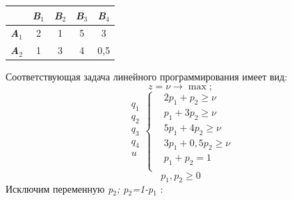 
\renewcommand{\arraystretch}{1.5}
\renewcommand{\tabcolsep}{0.2cm}
\begin{table}[h!]
\label{table_4_5}
\begin{center}
\begin{tabular}{|c|c|c|c|c|}
    \hline
     &  \textbf{\emph{B$_{1}$}} &  \textbf{\emph{B$_{2}$}} & \textbf{\emph{B$_{3}$}} & \textbf{\emph{B$_{4}$}}  \\ \hline
  \multicolumn{1}{|c|}{\textbf{\emph{A$_{1}$}}} & 2 & 1 & 5 & 3  \\ \hline
  \multicolumn{1}{|c|}{\textbf{\emph{A$_{2}$}}} & 1 & 3 & 4 & 0,5 \\ \hline
\end{tabular}
\end{center}
\end{table}


Соответствующая задача линейного программирования имеет вид:
\begin{equation}
\label{equation_4_20}
z = \nu \to \max;
\end{equation}
\begin{equation}
\label{equation_4_21}
\begin{aligned}
q_1\\
q_2\\
q_3\\
q_4\\
u\\
\end{aligned}
\left\{
\begin{aligned}
&2p_1 + p_2 \geqslant \nu \\
&p_1 + 3p_2 \geqslant \nu \\
&5p_1 + 4p_2 \geqslant \nu \\
&3p_1 + 0,5p_2 \geqslant \nu \\
&p_1 + p_2 = 1 \\
\end{aligned}
\right.
\end{equation}
\begin{equation}
\label{equation_4_22}
p_1, p_2 \geqslant 0
\end{equation}
Исключим переменную \emph{p$_{2}$; p$_{2}$=1-p$_{1}$} :













